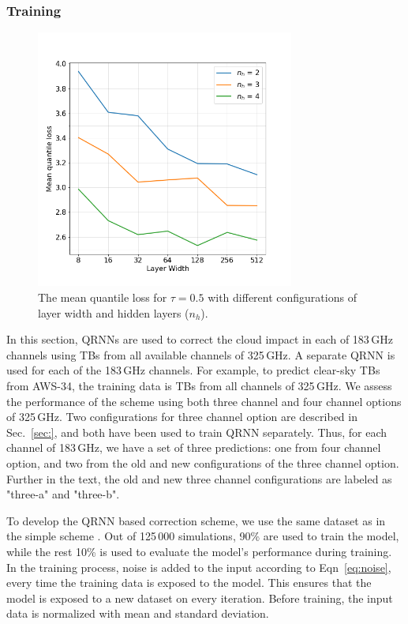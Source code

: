 \documentclass[12pt]{article}
\begin{document}
\subsubsection{Training}
%  
\label{sec:qrnn:training}
\begin{figure}[!ht]
	\centering
	\includegraphics[height=85mm]{quantile_loss.png}
	\caption{The mean quantile loss for $\tau = 0.5$ with different configurations of layer width and hidden layers ($n_h$).}
	\label{fig:quantile_loss}
\end{figure}
In this section, QRNNs are used to correct the cloud impact in each of 183\,GHz channels using TBs from all available channels of 325\,GHz. A separate QRNN is used for each of the 183\,GHz channels. For example, to predict clear-sky TBs from AWS-34, the training data is TBs from all channels of 325\,GHz. We assess the performance of the scheme using both three channel and four channel options of 325\,GHz. Two configurations for three channel option are described in Sec.~\ref{sec:}, and both have been used to train QRNN separately. Thus, for each channel of 183\,GHz, we have a set of three predictions: one from four channel option, and two from the old and new configurations of the three channel option. Further in the text, the old and new three channel configurations are labeled as "three-a" and "three-b".

To develop the QRNN based correction scheme, we use the same dataset as in the simple scheme . Out of 125\,000 simulations, 90\% are used to train the model, while the rest 10\% is used to evaluate the model's performance during training. In the training process, noise is added to the input according to Eqn~\ref{eq:noise}, every time the training data is exposed to the model. This ensures that the model is exposed to a new dataset on every iteration. Before training, the input data is normalized with mean and standard deviation.
\end{document}
